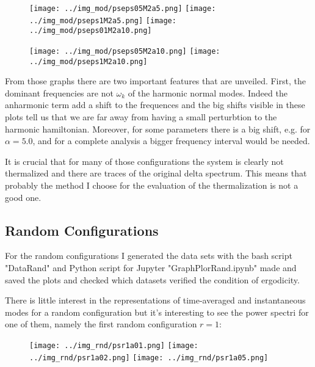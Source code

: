 \documentclass[10pt]{article}
\numberwithin{equation}{section}
\begin{document}
\begin{figure}[!htb]
    \texttt{[image: ../img\_mod/pseps05M2a5.png]}
\endminipage \hfill
{}
    \texttt{[image: ../img\_mod/pseps1M2a5.png]}
\endminipage \hfill
{}
    \texttt{[image: ../img\_mod/pseps01M2a10.png]}
\endminipage 
\end{figure}

\begin{figure}[!htb]
    \texttt{[image: ../img\_mod/pseps05M2a10.png]}
\endminipage \hfill
{}
    \texttt{[image: ../img\_mod/pseps1M2a10.png]}
\endminipage 
\end{figure}

From those graphs there are two important features that are unveiled. First, the dominant frequencies are not $\omega_k$ of the harmonic normal modes. Indeed the anharmonic term add a shift to the frequences and the big shifts visible in these plots tell us that we are far away from having a small perturbtion to the harmonic hamiltonian. Moreover, for some parameters there is a big shift, e.g. for $\alpha = 5.0$, and for a complete analysis a bigger frequency interval would be needed.

It is crucial that for many of those configurations the system is clearly not thermalized and there are traces of the original delta spectrum. This means that probably the method I choose for the evaluation of the thermalization is not a good one.

\clearpage

\subsection{Random Configurations}

For the random configurations I generated the data sets with the bash script "DataRand" and Python script for Jupyter "GraphPlorRand.ipynb" made and saved the plots and checked which datasets verified the condition of ergodicity.

There is little interest in the representations of time-averaged and instantaneous modes for a random configuration but it's interesting to see the power spectri for one of them, namely the first random configuration $r=1$:

\begin{figure}[!htb]
    \texttt{[image: ../img\_rnd/psr1a01.png]}
\endminipage \hfill
{}
    \texttt{[image: ../img\_rnd/psr1a02.png]}
\endminipage \hfill
{}
    \texttt{[image: ../img\_rnd/psr1a05.png]}
\endminipage 
\end{figure}
\end{document}
